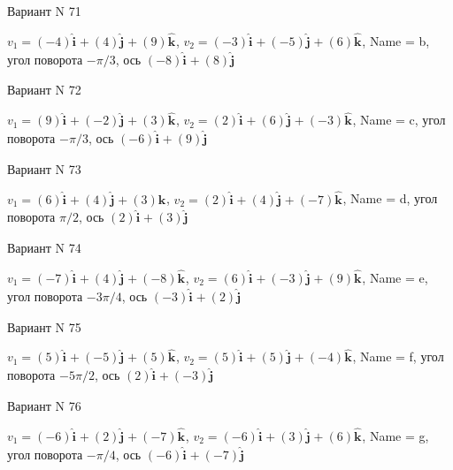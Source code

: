 \documentclass[11pt]{report}
\begin{document}
Вариант N 71

$v_1 = \left(-4\right)\mathbf{\hat{i}_{}} + \left(4\right)\mathbf{\hat{j}_{}} + \left(9\right)\mathbf{\hat{k}_{}}$, $v_2 = \left(-3\right)\mathbf{\hat{i}_{}} + \left(-5\right)\mathbf{\hat{j}_{}} + \left(6\right)\mathbf{\hat{k}_{}}$, Name = b, угол поворота $- \pi / 3$, ось $\left(-8\right)\mathbf{\hat{i}_{}} + \left(8\right)\mathbf{\hat{j}_{}}$

Вариант N 72

$v_1 = \left(9\right)\mathbf{\hat{i}_{}} + \left(-2\right)\mathbf{\hat{j}_{}} + \left(3\right)\mathbf{\hat{k}_{}}$, $v_2 = \left(2\right)\mathbf{\hat{i}_{}} + \left(6\right)\mathbf{\hat{j}_{}} + \left(-3\right)\mathbf{\hat{k}_{}}$, Name = c, угол поворота $- \pi / 3$, ось $\left(-6\right)\mathbf{\hat{i}_{}} + \left(9\right)\mathbf{\hat{j}_{}}$

Вариант N 73

$v_1 = \left(6\right)\mathbf{\hat{i}_{}} + \left(4\right)\mathbf{\hat{j}_{}} + \left(3\right)\mathbf{\hat{k}_{}}$, $v_2 = \left(2\right)\mathbf{\hat{i}_{}} + \left(4\right)\mathbf{\hat{j}_{}} + \left(-7\right)\mathbf{\hat{k}_{}}$, Name = d, угол поворота $\pi / 2$, ось $\left(2\right)\mathbf{\hat{i}_{}} + \left(3\right)\mathbf{\hat{j}_{}}$

Вариант N 74

$v_1 = \left(-7\right)\mathbf{\hat{i}_{}} + \left(4\right)\mathbf{\hat{j}_{}} + \left(-8\right)\mathbf{\hat{k}_{}}$, $v_2 = \left(6\right)\mathbf{\hat{i}_{}} + \left(-3\right)\mathbf{\hat{j}_{}} + \left(9\right)\mathbf{\hat{k}_{}}$, Name = e, угол поворота $- 3 \pi / 4$, ось $\left(-3\right)\mathbf{\hat{i}_{}} + \left(2\right)\mathbf{\hat{j}_{}}$

Вариант N 75

$v_1 = \left(5\right)\mathbf{\hat{i}_{}} + \left(-5\right)\mathbf{\hat{j}_{}} + \left(5\right)\mathbf{\hat{k}_{}}$, $v_2 = \left(5\right)\mathbf{\hat{i}_{}} + \left(5\right)\mathbf{\hat{j}_{}} + \left(-4\right)\mathbf{\hat{k}_{}}$, Name = f, угол поворота $- 5 \pi / 2$, ось $\left(2\right)\mathbf{\hat{i}_{}} + \left(-3\right)\mathbf{\hat{j}_{}}$

Вариант N 76

$v_1 = \left(-6\right)\mathbf{\hat{i}_{}} + \left(2\right)\mathbf{\hat{j}_{}} + \left(-7\right)\mathbf{\hat{k}_{}}$, $v_2 = \left(-6\right)\mathbf{\hat{i}_{}} + \left(3\right)\mathbf{\hat{j}_{}} + \left(6\right)\mathbf{\hat{k}_{}}$, Name = g, угол поворота $- \pi / 4$, ось $\left(-6\right)\mathbf{\hat{i}_{}} + \left(-7\right)\mathbf{\hat{j}_{}}$
\end{document}
